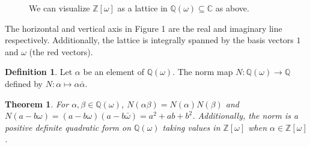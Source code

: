 \documentclass[12pt]{amsart}
\newtheorem{theorem}{Theorem}
\theoremstyle{definition}
\newtheorem*{definition}{Definition}
\theoremstyle{remark}
\begin{document}
\begin{figure}[h]
\caption{We can visualize $\mathbb{Z}[\omega]$ as a lattice in $\mathbb{Q}(\omega)\subseteq\mathbb{C}$ as above.}
\label{fig:Example}
\end{figure}

The horizontal and vertical axis in Figure 1 are the real and imaginary line respectively. Additionally, the lattice is integrally spanned by the basis vectors $1$ and $\omega$ (the red vectors).\\

\begin{definition}\label{def:Norm}
    Let $\alpha$ be an element of $\mathbb{Q}(\omega)$. The norm map $N:\mathbb{Q}(\omega)\to\mathbb{Q}$ defined by $N:\alpha\mapsto\alpha\bar{\alpha}$.
\end{definition}
\begin{theorem}\label{Thm:PosDef}
    For $\alpha,\beta\in\mathbb{Q}(\omega)$, $N(\alpha\beta) = N(\alpha)N(\beta)$ and $N(a-b\omega) = (a-b\omega)(a-b\bar{\omega}) = a^2+ab+b^2$. Additionally, the norm is a positive definite quadratic form on $\mathbb{Q}(\omega)$ taking values in $\mathbb{Z}[\omega]$ when $\alpha\in\mathbb{Z}[\omega]$.
\end{theorem}
\end{document}

